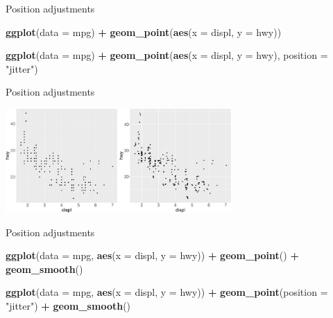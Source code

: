 \documentclass[ignorenonframetext,]{beamer}
\newenvironment{Shaded}{\begin{snugshade}}{\end{snugshade}}
\newcommand{\DataTypeTok}[1]{\textcolor[rgb]{0.13,0.29,0.53}{#1}}
\newcommand{\KeywordTok}[1]{\textcolor[rgb]{0.13,0.29,0.53}{\textbf{#1}}}
\newcommand{\NormalTok}[1]{#1}
\newcommand{\OperatorTok}[1]{\textcolor[rgb]{0.81,0.36,0.00}{\textbf{#1}}}
\newcommand{\StringTok}[1]{\textcolor[rgb]{0.31,0.60,0.02}{#1}}
\begin{document}
\begin{frame}[fragile]{Position adjustments}
\protect\hypertarget{position-adjustments-7}{}

\begin{Shaded}
\begin{Highlighting}[]
\KeywordTok{ggplot}\NormalTok{(}\DataTypeTok{data =}\NormalTok{ mpg) }\OperatorTok{+}\StringTok{ }
\StringTok{  }\KeywordTok{geom_point}\NormalTok{(}\KeywordTok{aes}\NormalTok{(}\DataTypeTok{x =}\NormalTok{ displ, }\DataTypeTok{y =}\NormalTok{ hwy))}

\KeywordTok{ggplot}\NormalTok{(}\DataTypeTok{data =}\NormalTok{ mpg) }\OperatorTok{+}\StringTok{ }
\StringTok{  }\KeywordTok{geom_point}\NormalTok{(}\KeywordTok{aes}\NormalTok{(}\DataTypeTok{x =}\NormalTok{ displ, }\DataTypeTok{y =}\NormalTok{ hwy),}
             \DataTypeTok{position =} \StringTok{"jitter"}\NormalTok{)}
\end{Highlighting}
\end{Shaded}

\end{frame}

\begin{frame}{Position adjustments}
\protect\hypertarget{position-adjustments-8}{}

\begin{center}\includegraphics[height=150px]{data-visualization_files/figure-beamer/unnamed-chunk-131-1} \end{center}

\end{frame}

\begin{frame}[fragile]{Position adjustments}
\protect\hypertarget{position-adjustments-9}{}

\begin{Shaded}
\begin{Highlighting}[]
\KeywordTok{ggplot}\NormalTok{(}\DataTypeTok{data =}\NormalTok{ mpg,  }\KeywordTok{aes}\NormalTok{(}\DataTypeTok{x =}\NormalTok{ displ, }\DataTypeTok{y =}\NormalTok{ hwy)) }\OperatorTok{+}\StringTok{ }
\StringTok{  }\KeywordTok{geom_point}\NormalTok{() }\OperatorTok{+}
\StringTok{  }\KeywordTok{geom_smooth}\NormalTok{()}

\KeywordTok{ggplot}\NormalTok{(}\DataTypeTok{data =}\NormalTok{ mpg, }\KeywordTok{aes}\NormalTok{(}\DataTypeTok{x =}\NormalTok{ displ, }\DataTypeTok{y =}\NormalTok{ hwy)) }\OperatorTok{+}\StringTok{ }
\StringTok{  }\KeywordTok{geom_point}\NormalTok{(}\DataTypeTok{position =} \StringTok{"jitter"}\NormalTok{) }\OperatorTok{+}
\StringTok{  }\KeywordTok{geom_smooth}\NormalTok{()}
\end{Highlighting}
\end{Shaded}

\end{frame}
\end{document}
